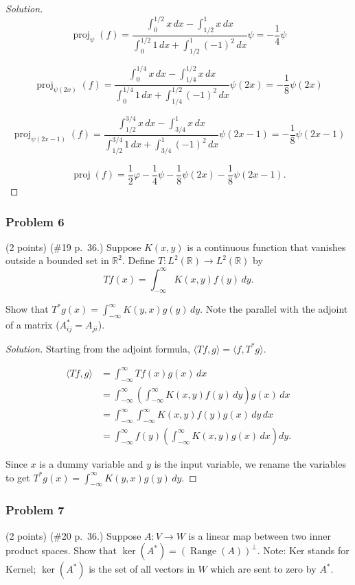 \documentclass[11pt]{article}
\newcommand{\R}{\mathbb{R}}
\newcommand{\1}{\mathbf{1}}
\DeclareMathOperator{\Ker}{ker}
\theoremstyle{definition}
\newenvironment{solution}{\begin{proof}[Solution]}{\end{proof}}
\begin{document}
\begin{solution}
\[
\operatorname{proj}_{\psi}(f)
=
\frac{\int_0^{1/2}x\,dx-\int_{1/2}^1x\,dx}
{\int_0^{1/2}1\,dx+\int_{1/2}^1(-1)^2\,dx}\psi
=
-\frac14\psi
\]

\[
\operatorname{proj}_{\psi(2x)}(f)
=
\frac{\int_0^{1/4}x\,dx-\int_{1/4}^{1/2}x\,dx}
{\int_0^{1/4}1\,dx+\int_{1/4}^{1/2}(-1)^2\,dx}\psi(2x)
=
-\frac18\psi(2x)
\]

\[
\operatorname{proj}_{\psi(2x-1)}(f)
=
\frac{\int_{1/2}^{3/4}x\,dx-\int_{3/4}^1x\,dx}
{\int_{1/2}^{3/4}1\,dx+\int_{3/4}^1(-1)^2\,dx}\psi(2x-1)
=
-\frac18\psi(2x-1)
\]

\[
\operatorname{proj}(f)
=
\frac12\varphi
-\frac14\psi
-\frac18\psi(2x)
-\frac18\psi(2x-1).
\]
\end{solution}

\subsubsection*{Problem 6}
(2 points) (\#19 p.~36.) Suppose $K(x,y)$ is a continuous function that vanishes outside a bounded set in $\R^2$. Define $T:L^2(\R)\to L^2(\R)$ by
\[
Tf(x)=\int_{-\infty}^{\infty}K(x,y)f(y)\,dy.
\]

Show that $T^*g(x)=\int_{-\infty}^{\infty}K(y,x)g(y)\,dy$. Note the parallel with the adjoint of a matrix ($A^*_{ij}=A_{ji}$).

\begin{solution}
Starting from the adjoint formula, $\langle Tf,g\rangle=\langle f,T^*g\rangle$.

\[
\begin{aligned}
\langle Tf,g\rangle
&=
\int_{-\infty}^{\infty}Tf(x)g(x)\,dx\\
&=
\int_{-\infty}^{\infty}
\left(\int_{-\infty}^{\infty}K(x,y)f(y)\,dy\right)g(x)\,dx\\
&=
\int_{-\infty}^{\infty}
\int_{-\infty}^{\infty}K(x,y)f(y)g(x)\,dy\,dx\\
&=
\int_{-\infty}^{\infty}
f(y)\left(\int_{-\infty}^{\infty}K(x,y)g(x)\,dx\right)dy.
\end{aligned}
\]

\par Since $x$ is a dummy variable and $y$ is the input variable, we rename the variables to get $T^*g(x)=\int_{-\infty}^{\infty}K(y,x)g(y)\,dy$.
\end{solution}

\subsubsection*{Problem 7}
(2 points) (\#20 p.~36.) Suppose $A:V\to W$ is a linear map between two inner product spaces. Show that $\Ker(A^*)=(\operatorname{Range}(A))^\perp$. Note: Ker stands for Kernel; $\Ker(A^*)$ is the set of all vectors in $W$ which are sent to zero by $A^*$.
\end{document}
